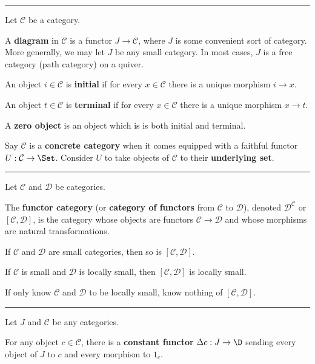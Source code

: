 \documentclass[12pt]{article}
\newcommand{\keyword}[1]{\textbf{#1}}
\newcommand{\sepline}{\rule{\textwidth}{0.4pt}}
\theoremstyle{definition}
\newcommand{\CC}{\mathcal{C}}
\newcommand{\DD}{\mathcal{D}}
\newcommand{\<}{\left\langle}
\renewcommand{\>}{\right\rangle}
\begin{document}
\sepline

Let $\CC$ be a category.

A \keyword{diagram} in $\CC$ is a functor $J \to \CC$, where $J$ is some convenient sort of category.
More generally, we may let $J$ be any small category.
In most cases, $J$ is a free category (path category) on a quiver.

An object $i \in \CC$ is \keyword{initial} if for every $x \in \CC$ there is a unique morphism $i \to x$.

An object $t \in \CC$ is \keyword{terminal} if for every $x \in \CC$ there is a unique morphism $x \to t$.

A \keyword{zero object} is an object which is is both initial and terminal.

Say $\CC$ is a \keyword{concrete category} when it comes equipped with a faithful functor $U : \CC \to \Set$.
Consider $U$ to take objects of $\CC$ to their \keyword{underlying set}.

\sepline

Let $\CC$ and $\DD$ be categories.

The \keyword{functor category} (or \keyword{category of functors} from $\CC$ to $\DD$), denoted $\DD^\CC$ or $[\CC, \DD]$, is the category whose objects are functors $\CC \to \DD$ and whose morphisms are natural transformations.

If $\CC$ and $\DD$ are small categories, then so is $[\CC, \DD]$.

If $\CC$ is small and $\DD$ is locally small, then $[\CC, \DD]$ is locally small.

If only know $\CC$ and $\DD$ to be locally small, know nothing of $[\CC, \DD]$.

\sepline

Let $J$ and $\CC$ be any categories.
 
For any object $c \in \CC$, there is a \keyword{constant functor} $\Delta c : J \to \D$ sending every object of $J$ to $c$ and every morphism to $1_c$.
\end{document}
